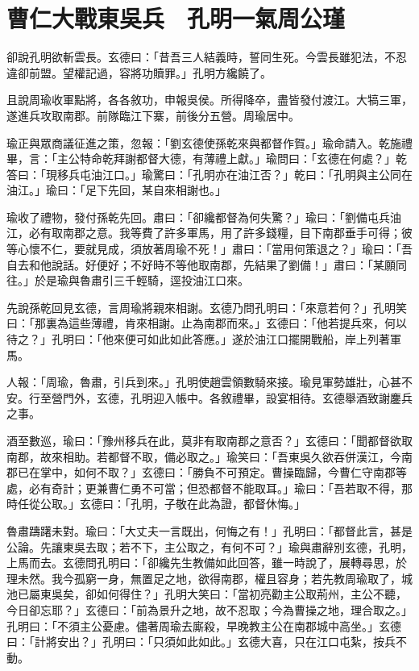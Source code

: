 
\chapter{曹仁大戰東吳兵　孔明一氣周公瑾}

卻說孔明欲斬雲長。玄德曰：「昔吾三人結義時，誓同生死。今雲長雖犯法，不忍違卻前盟。望權記過，容將功贖罪。」孔明方纔饒了。

且說周瑜收軍點將，各各敘功，申報吳侯。所得降卒，盡皆發付渡江。大犒三軍，遂進兵攻取南郡。前隊臨江下寨，前後分五營。周瑜居中。

瑜正與眾商議征進之策，忽報：「劉玄德使孫乾來與都督作賀。」瑜命請入。乾施禮畢，言：「主公特命乾拜謝都督大德，有薄禮上獻。」瑜問曰：「玄德在何處？」乾答曰：「現移兵屯油江口。」瑜驚曰：「孔明亦在油江否？」乾曰：「孔明與主公同在油江。」瑜曰：「足下先回，某自來相謝也。」

瑜收了禮物，發付孫乾先回。肅曰：「卻纔都督為何失驚？」瑜曰：「劉備屯兵油江，必有取南郡之意。我等費了許多軍馬，用了許多錢糧，目下南郡垂手可得；彼等心懷不仁，要就見成，須放著周瑜不死！」肅曰：「當用何策退之？」瑜曰：「吾自去和他說話。好便好；不好時不等他取南郡，先結果了劉備！」肅曰：「某願同往。」於是瑜與魯肅引三千輕騎，逕投油江口來。

先說孫乾回見玄德，言周瑜將親來相謝。玄德乃問孔明曰：「來意若何？」孔明笑曰：「那裏為這些薄禮，肯來相謝。止為南郡而來。」玄德曰：「他若提兵來，何以待之？」孔明曰：「他來便可如此如此答應。」遂於油江口擺開戰船，岸上列著軍馬。

人報：「周瑜，魯肅，引兵到來。」孔明使趙雲領數騎來接。瑜見軍勢雄壯，心甚不安。行至營門外，玄德，孔明迎入帳中。各敘禮畢，設宴相待。玄德舉酒致謝鏖兵之事。

酒至數巡，瑜曰：「豫州移兵在此，莫非有取南郡之意否？」玄德曰：「聞都督欲取南郡，故來相助。若都督不取，備必取之。」瑜笑曰：「吾東吳久欲吞併漢江，今南郡已在掌中，如何不取？」玄德曰：「勝負不可預定。曹操臨歸，今曹仁守南郡等處，必有奇計；更兼曹仁勇不可當；但恐都督不能取耳。」瑜曰：「吾若取不得，那時任從公取。」玄德曰：「孔明，子敬在此為證，都督休悔。」

魯肅躊躇未對。瑜曰：「大丈夫一言既出，何悔之有！」孔明曰：「都督此言，甚是公論。先讓東吳去取；若不下，主公取之，有何不可？」瑜與肅辭別玄德，孔明，上馬而去。玄德問孔明曰：「卻纔先生教備如此回答，雖一時說了，展轉尋思，於理未然。我今孤窮一身，無置足之地，欲得南郡，權且容身；若先教周瑜取了，城池已屬東吳矣，卻如何得住？」孔明大笑曰：「當初亮勸主公取荊州，主公不聽，今日卻忘耶？」玄德曰：「前為景升之地，故不忍取；今為曹操之地，理合取之。」孔明曰：「不須主公憂慮。儘著周瑜去廝殺，早晚教主公在南郡城中高坐。」玄德曰：「計將安出？」孔明曰：「只須如此如此。」玄德大喜，只在江口屯紮，按兵不動。

